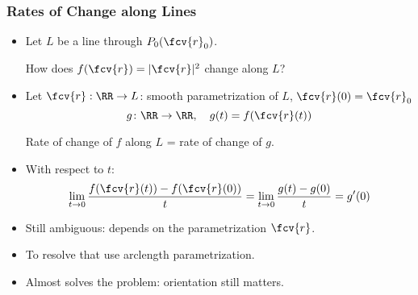 \begin{frame}
  \frametitle{Rates of Change along Lines}
\begin{itemize}
\item Let $L$ be a line through $P_0(\fcv{r}_0)$.
\begin{center}  How does $f(\fcv{r}) = |\fcv{r}|^2$ change \alert<1->{along $L$}?  
\end{center}
\item<2-> Let $\fcv{r} : \RR \to L$: smooth parametrization of $L$, $\fcv{r}(0) = \fcv{r}_0$
$$g\colon \RR \to \RR, \quad g(t) = f(\fcv{r}(t))$$
\begin{center}
    Rate of change of $f$ along $L$ = rate of change of $g$.
  \end{center}
\item<3-> With respect to $t$:
  $$\lim_{t\to 0} \frac{f(\fcv{r}(t))-f(\fcv{r}(0))}{t} =
  \lim_{t\to 0} \frac{g(t)-g(0)}{t} = g'(0)$$
\item<4-> Still ambiguous: depends on the parametrization $\fcv{r}$.
\item<5-> To resolve that use arclength parametrization.
\item<6-> Almost solves the problem: orientation still matters.
\end{itemize}
\end{frame}
